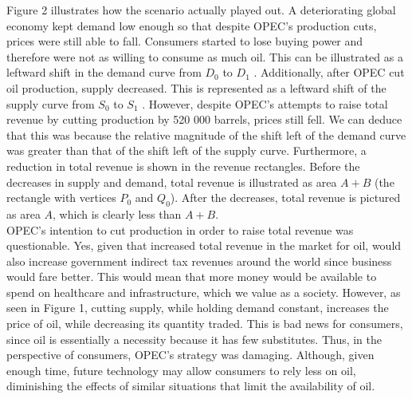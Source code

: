 \documentclass[12pt]{article}
\begin{document}
\begin{center}
\end{center} 

Figure 2 illustrates how the scenario actually played out. A deteriorating global economy kept demand low enough so that despite OPEC's production cuts, prices were still able to fall. Consumers started to lose buying power and therefore were not as willing to consume as much oil. This can be illustrated as a leftward shift in the demand curve from  $D_0$  to  $D_1$ . Additionally, after OPEC cut oil production, supply decreased. This is represented as a leftward shift of the supply curve from  $S_0$  to  $S_1$ . However, despite OPEC's attempts to raise total revenue by cutting production by 520 000 barrels, prices still fell. We can deduce that this was because the relative magnitude of the shift left of the demand curve was greater than that of the shift left of the supply curve. Furthermore, a reduction in total revenue is shown in the revenue rectangles. Before the decreases in supply and demand, total revenue is illustrated as area $A + B$ (the rectangle with vertices $P_0$  and  $Q_0$). After the decreases, total revenue is pictured as area $A$, which is clearly less than $A + B$.\\

OPEC’s intention to cut production in order to raise total revenue was questionable. Yes, given that increased total revenue in the market for oil, would also increase government indirect tax revenues around the world since business would fare better. This would mean that more money would be available to spend on healthcare and infrastructure, which we value as a society.  However, as seen in Figure 1, cutting supply, while holding demand constant, increases the price of oil, while decreasing its quantity traded. This is bad news for consumers, since oil is essentially a necessity because it has few substitutes. Thus, in the perspective of consumers, OPEC’s strategy was damaging. Although, given enough time, future technology may allow consumers to rely less on oil, diminishing the effects of similar situations that limit the availability of oil. \\
\end{document}
